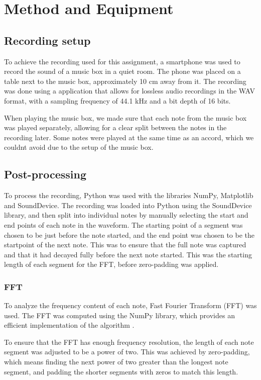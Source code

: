 \chapter{Method and Equipment}

\section{Recording setup}

To achieve the recording used for this assignment, a smartphone was used to record the sound of a music box in a quiet room. The phone was placed on a table next to the music box, approximately 10 cm away from it. The recording was done using a application that allows for lossless audio recordings in the WAV format, with a sampling frequency of 44.1 kHz and a bit depth of 16 bits.

When playing the music box, we made sure that each note from the music box was played separately, allowing for a clear split between the notes in the recording later. Some notes were played at the same time as an accord, which we couldnt avoid due to the setup of the music box. 

\section{Post-processing}

To process the recording, Python was used with the libraries NumPy, Matplotlib and SoundDevice. The recording was loaded into Python using the SoundDevice library, and then split into individual notes by manually selecting the start and end points of each note in the waveform. The starting point of a segment was chosen to be just before the note started, and the end point was chosen to be the startpoint of the next note. This was to ensure that the full note was captured and that it had decayed fully before the next note started. This was the starting length of each segment for the FFT, before zero-padding was applied.

\subsection{FFT}

To analyze the frequency content of each note, Fast Fourier Transform (FFT) was used. The FFT was computed using the NumPy library, which provides an efficient implementation of the algorithm \cite{NumPyFFT}.

To ensure that the FFT has enough frequency resolution, the length of each note segment was adjusted to be a power of two. This was achieved by zero-padding, which means finding the next power of two greater than the longest note segment, and padding the shorter segments with zeros to match this length. 

